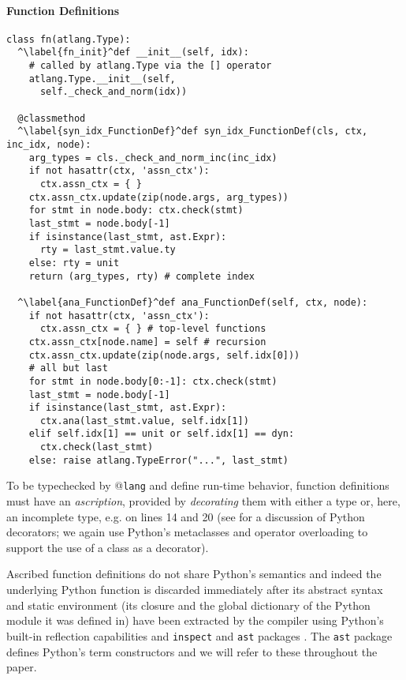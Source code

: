 \documentclass[9pt]{sigplanconf}
\newcommand{\lstinlinep}[1]{\lstinline[language=Python,basicstyle=\ttfamily\small,deletendkeywords={tuple,buffer,map}]{#1}}
\begin{document}
\paragraph{Function Definitions}
\begin{codelisting}[t]
\begin{lstlisting}
class fn(atlang.Type):
  ^\label{fn_init}^def __init__(self, idx): 
    # called by atlang.Type via the [] operator 
    atlang.Type.__init__(self, 
      self._check_and_norm(idx))

  @classmethod
  ^\label{syn_idx_FunctionDef}^def syn_idx_FunctionDef(cls, ctx, inc_idx, node):
    arg_types = cls._check_and_norm_inc(inc_idx)
    if not hasattr(ctx, 'assn_ctx'): 
      ctx.assn_ctx = { }
    ctx.assn_ctx.update(zip(node.args, arg_types))
    for stmt in node.body: ctx.check(stmt)
    last_stmt = node.body[-1]
    if isinstance(last_stmt, ast.Expr): 
      rty = last_stmt.value.ty
    else: rty = unit
    return (arg_types, rty) # complete index

  ^\label{ana_FunctionDef}^def ana_FunctionDef(self, ctx, node):
    if not hasattr(ctx, 'assn_ctx'): 
      ctx.assn_ctx = { } # top-level functions
    ctx.assn_ctx[node.name] = self # recursion
    ctx.assn_ctx.update(zip(node.args, self.idx[0]))
    # all but last
    for stmt in node.body[0:-1]: ctx.check(stmt)
    last_stmt = node.body[-1]
    if isinstance(last_stmt, ast.Expr): 
      ctx.ana(last_stmt.value, self.idx[1])
    elif self.idx[1] == unit or self.idx[1] == dyn: 
      ctx.check(last_stmt)
    else: raise atlang.TypeError("...", last_stmt)
\end{lstlisting}
\caption{A portion of the type constructor \texttt{atlib.fn}.}
\label{fn-top}
\end{codelisting}
 To be typechecked by @\texttt{lang} and define run-time behavior, function definitions must have an \emph{ascription}, provided by \emph{decorating} them with either a type or, here, an incomplete type, e.g. on lines 14 and 20 (see \cite{python} for a discussion of Python decorators; we again use Python's metaclasses and operator overloading to support the use of a class as a decorator). 

 Ascribed function definitions do not share Python's semantics and indeed the underlying Python function is discarded immediately after its abstract syntax and static environment (its closure and the global dictionary of the Python module it was defined in) have been extracted by the compiler using Python's built-in reflection capabilities and \lstinlinep{inspect} and \lstinlinep{ast} packages \cite{python}. The \lstinlinep{ast} package defines Python's term constructors and we will refer to these throughout the paper.
\end{document}

